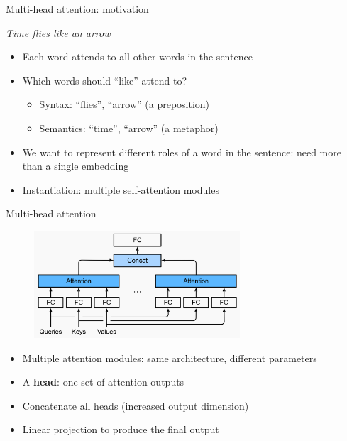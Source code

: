 \documentclass[usenames,dvipsnames,notes,11pt,aspectratio=169,hyperref={colorlinks=true, linkcolor=blue}]{beamer}
\begin{document}
\begin{frame}
    {Multi-head attention: motivation}
    \begin{center}
        \textit{Time flies like an arrow}
    \end{center}
    \begin{itemize}
        \item Each word attends to all other words in the sentence
        \item Which words should ``like'' attend to?
            \pause
            \begin{itemize}
                \item Syntax: ``flies'', ``arrow'' (a preposition)
                \item Semantics: ``time'', ``arrow'' (a metaphor)
            \end{itemize}
        \pause
        \item We want to represent different roles of a word in the sentence: need more than a single embedding
        \item Instantiation: multiple self-attention modules
    \end{itemize}
\end{frame}

\begin{frame}
    {Multi-head attention}
    \begin{figure}
        \includegraphics[height=4cm]{figures/multihead}
    \end{figure}
    \begin{itemize}
        \item Multiple attention modules: same architecture, different parameters
            \pause
        \item A \textbf{head}: one set of attention outputs
            \pause
        \item Concatenate all heads (increased output dimension)
        \item Linear projection to produce the final output
    \end{itemize}
\end{frame}
\end{document}
